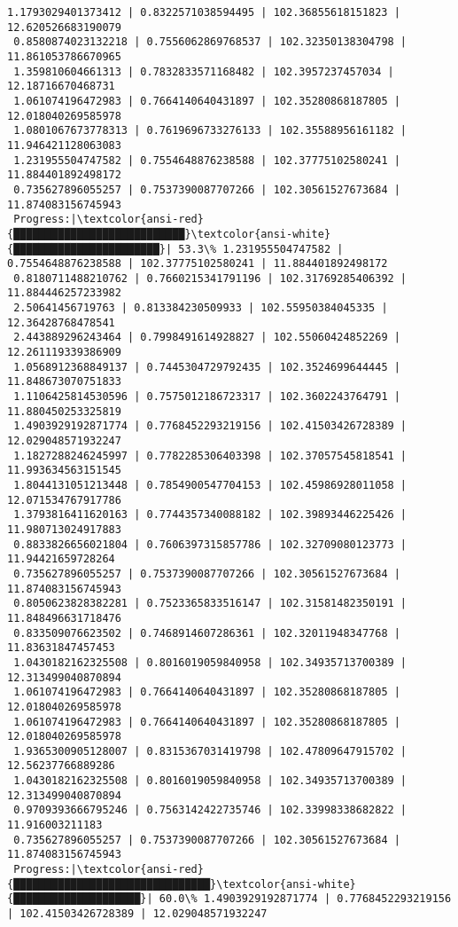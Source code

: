 \documentclass[11pt]{article}
\begin{document}
\begin{Verbatim}[commandchars=\\\{\}]
 1.1793029401373412 | 0.8322571038594495 | 102.36855618151823 | 12.620526683190079
 0.8580874023132218 | 0.7556062869768537 | 102.32350138304798 | 11.861053786670965
 1.359810604661313 | 0.7832833571168482 | 102.3957237457034 | 12.18716670468731
 1.061074196472983 | 0.7664140640431897 | 102.35280868187805 | 12.018040269585978
 1.0801067673778313 | 0.7619696733276133 | 102.35588956161182 | 11.946421128063083
 1.231955504747582 | 0.7554648876238588 | 102.37775102580241 | 11.884401892498172
 0.735627896055257 | 0.7537390087707266 | 102.30561527673684 | 11.874083156745943
 Progress:|\textcolor{ansi-red}{███████████████████████████}\textcolor{ansi-white}{███████████████████████}| 53.3\% 1.231955504747582 | 0.7554648876238588 | 102.37775102580241 | 11.884401892498172
 0.8180711488210762 | 0.7660215341791196 | 102.31769285406392 | 11.884446257233982
 2.50641456719763 | 0.813384230509933 | 102.55950384045335 | 12.36428768478541
 2.443889296243464 | 0.7998491614928827 | 102.55060424852269 | 12.261119339386909
 1.0568912368849137 | 0.7445304729792435 | 102.3524699644445 | 11.848673070751833
 1.1106425814530596 | 0.7575012186723317 | 102.3602243764791 | 11.880450253325819
 1.4903929192871774 | 0.7768452293219156 | 102.41503426728389 | 12.029048571932247
 1.1827288246245997 | 0.7782285306403398 | 102.37057545818541 | 11.993634563151545
 1.8044131051213448 | 0.7854900547704153 | 102.45986928011058 | 12.071534767917786
 1.3793816411620163 | 0.7744357340088182 | 102.39893446225426 | 11.980713024917883
 0.8833826656021804 | 0.7606397315857786 | 102.32709080123773 | 11.94421659728264
 0.735627896055257 | 0.7537390087707266 | 102.30561527673684 | 11.874083156745943
 0.8050623828382281 | 0.7523365833516147 | 102.31581482350191 | 11.848496631718476
 0.833509076623502 | 0.7468914607286361 | 102.32011948347768 | 11.83631847457453
 1.0430182162325508 | 0.8016019059840958 | 102.34935713700389 | 12.313499040870894
 1.061074196472983 | 0.7664140640431897 | 102.35280868187805 | 12.018040269585978
 1.061074196472983 | 0.7664140640431897 | 102.35280868187805 | 12.018040269585978
 1.9365300905128007 | 0.8315367031419798 | 102.47809647915702 | 12.56237766889286
 1.0430182162325508 | 0.8016019059840958 | 102.34935713700389 | 12.313499040870894
 0.9709393666795246 | 0.7563142422735746 | 102.33998338682822 | 11.916003211183
 0.735627896055257 | 0.7537390087707266 | 102.30561527673684 | 11.874083156745943
 Progress:|\textcolor{ansi-red}{███████████████████████████████}\textcolor{ansi-white}{████████████████████}| 60.0\% 1.4903929192871774 | 0.7768452293219156 | 102.41503426728389 | 12.029048571932247

\end{Verbatim}
\end{document}
